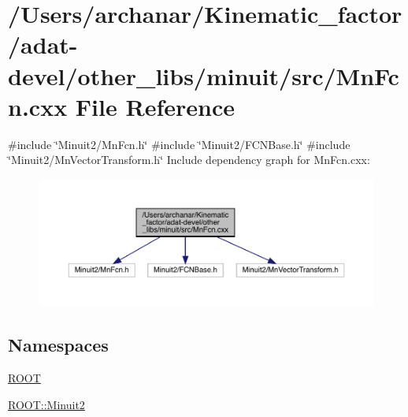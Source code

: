 \hypertarget{adat-devel_2other__libs_2minuit_2src_2MnFcn_8cxx}{}\section{/\+Users/archanar/\+Kinematic\+\_\+factor/adat-\/devel/other\+\_\+libs/minuit/src/\+Mn\+Fcn.cxx File Reference}
\label{adat-devel_2other__libs_2minuit_2src_2MnFcn_8cxx}
{\ttfamily \#include \char`\"{}Minuit2/\+Mn\+Fcn.\+h\char`\"{}}\newline
{\ttfamily \#include \char`\"{}Minuit2/\+F\+C\+N\+Base.\+h\char`\"{}}\newline
{\ttfamily \#include \char`\"{}Minuit2/\+Mn\+Vector\+Transform.\+h\char`\"{}}\newline
Include dependency graph for Mn\+Fcn.\+cxx\+:
\nopagebreak
\begin{figure}[H]
\begin{center}
\leavevmode
\includegraphics[width=350pt]{df/da7/adat-devel_2other__libs_2minuit_2src_2MnFcn_8cxx__incl}
\end{center}
\end{figure}
\subsection*{Namespaces}
\begin{DoxyCompactItemize}
\item 
 \mbox{\hyperlink{namespaceROOT}{R\+O\+OT}}
\item 
 \mbox{\hyperlink{namespaceROOT_1_1Minuit2}{R\+O\+O\+T\+::\+Minuit2}}
\end{DoxyCompactItemize}
